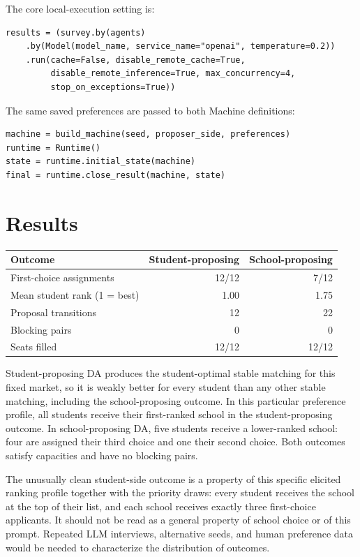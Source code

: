 \documentclass[11pt]{article}
\begin{document}
The core local-execution setting is:
\begin{lstlisting}[style=python]
results = (survey.by(agents)
    .by(Model(model_name, service_name="openai", temperature=0.2))
    .run(cache=False, disable_remote_cache=True,
         disable_remote_inference=True, max_concurrency=4,
         stop_on_exceptions=True))
\end{lstlisting}

The same saved preferences are passed to both Machine definitions:
\begin{lstlisting}[style=python]
machine = build_machine(seed, proposer_side, preferences)
runtime = Runtime()
state = runtime.initial_state(machine)
final = runtime.close_result(machine, state)
\end{lstlisting}

\section{Results}
\begin{center}
\begin{tabular}{lrr}
\toprule
Outcome & Student-proposing & School-proposing \\
\midrule
First-choice assignments & 12/12 & 7/12 \\
Mean student rank (1 = best) & 1.00 & 1.75 \\
Proposal transitions & 12 & 22 \\
Blocking pairs & 0 & 0 \\
Seats filled & 12/12 & 12/12 \\
\bottomrule
\end{tabular}
\end{center}

Student-proposing DA produces the student-optimal stable matching for this fixed market, so it is weakly better for every student than any other stable matching, including the school-proposing outcome. In this particular preference profile, all students receive their first-ranked school in the student-proposing outcome. In school-proposing DA, five students receive a lower-ranked school: four are assigned their third choice and one their second choice. Both outcomes satisfy capacities and have no blocking pairs.

The unusually clean student-side outcome is a property of this specific elicited ranking profile together with the priority draws: every student receives the school at the top of their list, and each school receives exactly three first-choice applicants. It should not be read as a general property of school choice or of this prompt. Repeated LLM interviews, alternative seeds, and human preference data would be needed to characterize the distribution of outcomes.
\end{document}

